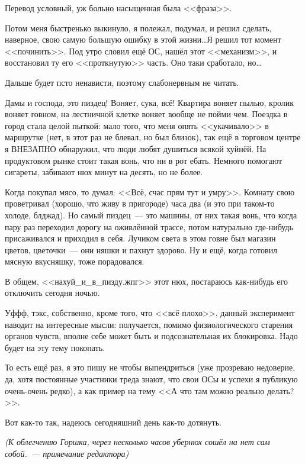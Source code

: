 \documentclass[a5paper,12pt,twoside]{memoir}
\begin{document}
\begin{shaded}
Перевод условный, уж больно насыщенная была <<фраза>>.

Потом меня быстренько выкинуло, я полежал, подумал, и решил сделать, наверное, свою самую большую ошибку в этой жизни\ldots Я решил тот момент <<починить>>.
Под утро словил ещё ОС, нашёл этот <<механизм>>, и восстановил ту его <<проткнутую>> часть.
Оно таки сработало, но…

Дальше будет псто ненависти, поэтому слабонервным не читать.

Дамы и господа, это пиздец! Воняет, сука, всё! Квартира воняет пылью, кролик воняет говном, на лестничной клетке воняет вообще не пойми чем. Поездка в город стала целой пыткой: мало того, что меня опять <<укачивало>> в маршрутке (нет, в этот раз не блевал, но был близок), так ещё в торговом центре я ВНЕЗАПНО обнаружил, что люди любят душиться всякой хуйнёй. На продуктовом рынке стоит такая вонь, что ни в рот ебать. Немного помогают сигареты, забивают нюх минут на десять, но не более.

Когда покупал мясо, то думал: <<Всё, счас прям тут и умру>>. Комнату свою проветривал (хорошо, что живу в пригороде) часа два (и это при таком-то холоде, блджад).
Но самый пиздец~--- это машины, от них такая вонь, что когда пару раз переходил дорогу на оживлённой трассе, потом натурально где-нибудь присаживался и приходил в себя.
Лучиком света в этом говне был магазин цветов, цветочки~--- они няшки и пахнут здорово. Ну и ещё, когда готовил мясную вкусняшку, тоже порадовался.

В общем, <<нахуй\_и\_в\_пизду.жпг>> этот нюх, постараюсь как-нибудь его отключить сегодня ночью.

Уффф, тэкс, собственно, кроме того, что <<всё плохо>>, данный эксперимент наводит на интересные мысли: получается, помимо физиологического старения органов чувств, вполне себе может быть и подсознательная их блокировка. Надо будет на эту тему покопать.

То есть ещё раз, я это пишу не чтобы выпендриться (уже прозреваю недоверие, да, хотя постоянные участники треда знают, что свои ОСы и успехи я публикую очень-очень редко), а как пример на тему <<А что там можно реально делать?>>.

Вот как-то так, надеюсь сегодняшний день как-то дотянуть.

\smallskip

\textit{(К облегчению Горшка, через несколько часов убернюх сошёл на нет сам собой.~--- примечание редактора)}

\end{shaded}
\end{document}
